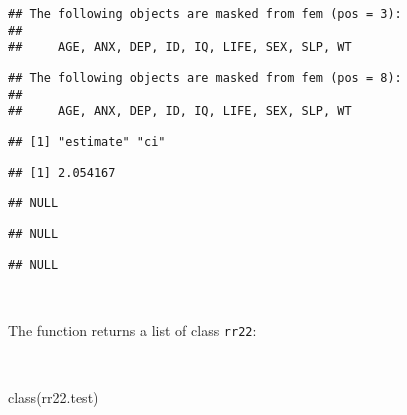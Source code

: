 \documentclass[
  12pt,
  a4paper]{book}
\newenvironment{Shaded}{\begin{snugshade}}{\end{snugshade}}
\newcommand{\AttributeTok}[1]{\textcolor[rgb]{0.77,0.63,0.00}{#1}}
\newcommand{\ConstantTok}[1]{\textcolor[rgb]{0.00,0.00,0.00}{#1}}
\newcommand{\DecValTok}[1]{\textcolor[rgb]{0.00,0.00,0.81}{#1}}
\newcommand{\FunctionTok}[1]{\textcolor[rgb]{0.00,0.00,0.00}{#1}}
\newcommand{\NormalTok}[1]{#1}
\newcommand{\OtherTok}[1]{\textcolor[rgb]{0.56,0.35,0.01}{#1}}
\newcommand{\SpecialCharTok}[1]{\textcolor[rgb]{0.00,0.00,0.00}{#1}}
\newcommand{\StringTok}[1]{\textcolor[rgb]{0.31,0.60,0.02}{#1}}
\begin{document}
\begin{Shaded}
\end{Shaded}

\begin{verbatim}
## The following objects are masked from fem (pos = 3):
## 
##     AGE, ANX, DEP, ID, IQ, LIFE, SEX, SLP, WT
\end{verbatim}

\begin{verbatim}
## The following objects are masked from fem (pos = 8):
## 
##     AGE, ANX, DEP, ID, IQ, LIFE, SEX, SLP, WT
\end{verbatim}

\begin{verbatim}
## [1] "estimate" "ci"
\end{verbatim}

\begin{verbatim}
## [1] 2.054167
\end{verbatim}

\begin{verbatim}
## NULL
\end{verbatim}

\begin{verbatim}
## NULL
\end{verbatim}

\begin{verbatim}
## NULL
\end{verbatim}

~

The function returns a list of class \texttt{rr22}:

~

\begin{Shaded}
\begin{Highlighting}[]
\FunctionTok{class}\NormalTok{(rr22.test)}
\end{Highlighting}
\end{Shaded}
\end{document}
